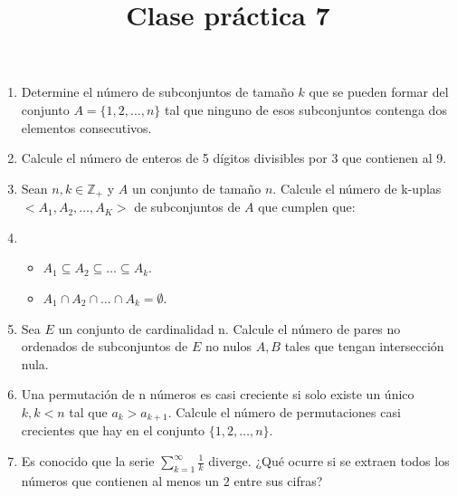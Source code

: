 \documentclass{article}
\title{Clase pr\'actica 7}
\begin{document}
\maketitle
\begin{enumerate}
	\item Determine el n\'umero de subconjuntos de tama\~no $k$ que se pueden formar del conjunto $A = \{1, 2, \dots, n \} $ tal que ninguno de esos subconjuntos contenga dos elementos consecutivos.
	\item Calcule el n\'umero de enteros de 5 d\'igitos divisibles por 3 que contienen al 9.
	\item Sean $n, k \in \mathbb{Z}_+$ y $A$ un conjunto de tama\~no $n$. Calcule el n\'umero de k-uplas $<A_1, A_2, \dots, A_K>$ de subconjuntos de $A$ que cumplen que:
	\item[] 
	\begin{itemize}
		\item $A_1 \subseteq A_2 \subseteq \dots \subseteq A_k$.
		\item $A_1 \cap A_2 \cap \dots \cap A_k = \emptyset$.
	\end{itemize}
	\item Sea $E$ un conjunto de cardinalidad n. Calcule el n\'umero de pares no ordenados de subconjuntos de $E$ no nulos $A,B$ tales que tengan intersecci\'on nula.
	\item Una permutaci\'on de n n\'umeros es casi creciente si solo existe un \'unico $k, k < n$ tal que $a_k > a_{k+1}$. Calcule el n\'umero de permutaciones casi crecientes que hay en el conjunto $\{1, 2, \dots, n\}$.
	\item Es conocido que la serie $\sum_{k=1}^{\infty} \frac{1}{k}$ diverge. ¿Qu\'e ocurre si se extraen todos los n\'umeros que contienen al menos un $2$ entre sus cifras?
\end{enumerate}
\end{document}
